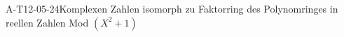 
\begin{EXA}{A-T12-05-24}{Komplexen Zahlen isomorph zu Faktorring des Polynomringes in reellen Zahlen Mod $(X^2+1)$}
\end{EXA}

